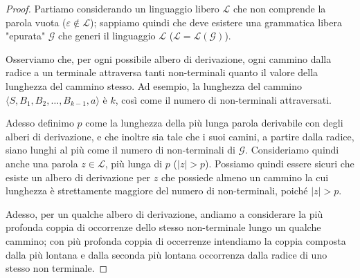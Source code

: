 \documentclass[class=book, crop=false, oneside, 12pt]{standalone}
\begin{document}
\begin{proof}
  Partiamo considerando un linguaggio libero \(\mathcal{L}\) che non comprende la parola vuota (\(\varepsilon \notin \mathcal{L}\)); sappiamo quindi che deve esistere una grammatica libera "epurata" \(\mathcal{G}\) che generi il linguaggio \(\mathcal{L}\) (\(\mathcal{L} = \mathcal{L(G)}\)).

  Osserviamo che, per ogni possibile albero di derivazione, ogni cammino dalla radice a un terminale attraversa tanti non-terminali quanto il valore della lunghezza del cammino stesso. Ad esempio, la lunghezza del cammino \(\langle S, B_1, B_2, \ldots, B_{k-1}, a \rangle\) è \(k\), così come il numero di non-terminali attraversati.

  Adesso definimo \(p\) come la lunghezza della più lunga parola derivabile con degli alberi di derivazione, e che inoltre sia tale che i suoi camini, a partire dalla radice, siano lunghi al più come il numero di non-terminali di \(\mathcal{G}\). Consideriamo quindi anche una parola \(z \in \mathcal{L}\), più lunga di \(p\) (\(|z| > p\)). Possiamo quindi essere sicuri che esiste un albero di derivazione per \(z\) che possiede almeno un cammino la cui lunghezza è strettamente maggiore del numero di non-terminali, poiché \(|z| >p\).

  Adesso, per un qualche albero di derivazione, andiamo a considerare la più profonda coppia di occorrenze dello stesso non-terminale lungo un qualche cammino; con più profonda coppia di occerrenze intendiamo la coppia composta dalla più lontana e dalla seconda più lontana occorrenza dalla radice di uno stesso non terminale.


\end{proof}
\end{document}
